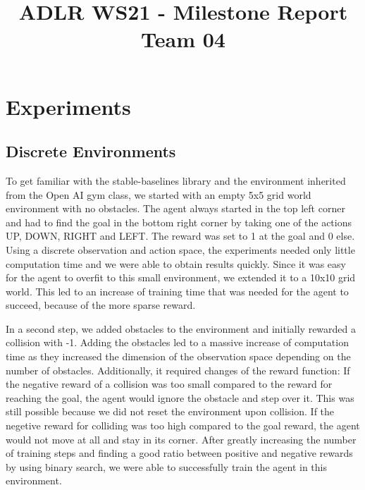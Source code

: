 \documentclass[conference]{IEEEtran}
\begin{document}
\title{ADLR WS21 - Milestone Report Team 04\\
}

\author{
\and
{}
}

\maketitle

\section{Experiments}

\subsection{Discrete Environments}

To get familiar with the stable-baselines library and the environment inherited from the Open AI gym class, we started with an empty 5x5 grid world environment with no obstacles. The agent always started in the top left corner and had to find the goal in the bottom right corner by taking one of the actions UP, DOWN, RIGHT and LEFT. The reward was set to 1 at the goal and 0 else. Using a discrete observation and action space, the experiments needed only little computation time and we were able to obtain results quickly. Since it was easy for the agent to overfit to this small environment, we extended it to a 10x10 grid world. This led to an increase of training time that was needed for the agent to succeed, because of the more sparse reward. 

In a second step, we added obstacles to the environment and initially rewarded a collision with -1. Adding the obstacles led to a massive increase of computation time as they increased the dimension of the observation space depending on the number of obstacles. Additionally, it required changes of the reward function: If the negative reward of a collision was too small compared to the reward for reaching the goal, the agent would ignore the obstacle and step over it. This was still possible because we did not reset the environment upon collision. If the negetive reward for colliding was too high compared to the goal reward, the agent would not move at all and stay in its corner. After greatly increasing the number of training steps and finding a good ratio between positive and negative rewards by using binary search, we were able to successfully train the agent in this environment.
\end{document}
